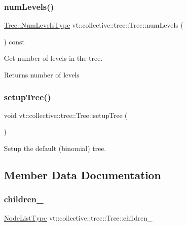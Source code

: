 \subsubsection{\texorpdfstring{num\+Levels()}{numLevels()}}
{\footnotesize\ttfamily \hyperlink{structvt_1_1collective_1_1tree_1_1_tree_af64acc9543dc1bd1b56d6ed17b003425}{Tree\+::\+Num\+Levels\+Type} vt\+::collective\+::tree\+::\+Tree\+::num\+Levels (\begin{DoxyParamCaption}{ }\end{DoxyParamCaption}) const}



Get number of levels in the tree. 

\begin{DoxyReturn}{Returns}
number of levels 
\end{DoxyReturn}
\mbox{\label{structvt_1_1collective_1_1tree_1_1_tree_aa3120d3bdbb2a308dd6831aa52d0ebb0}} 
\subsubsection{\texorpdfstring{setup\+Tree()}{setupTree()}}
{\footnotesize\ttfamily void vt\+::collective\+::tree\+::\+Tree\+::setup\+Tree (\begin{DoxyParamCaption}{ }\end{DoxyParamCaption})}



Setup the default (binomial) tree. 



\subsection{Member Data Documentation}
\mbox{\label{structvt_1_1collective_1_1tree_1_1_tree_ad4485d4ba90addf6bd7e25425d4cf6dd}} 
\subsubsection{\texorpdfstring{children\+\_\+}{children\_}}
{\footnotesize\ttfamily \hyperlink{structvt_1_1collective_1_1tree_1_1_tree_a834e7b54ea2dceae42db7c5ea859753f}{Node\+List\+Type} vt\+::collective\+::tree\+::\+Tree\+::children\+\_\+\hspace{0.3cm}{\ttfamily [private]}}

